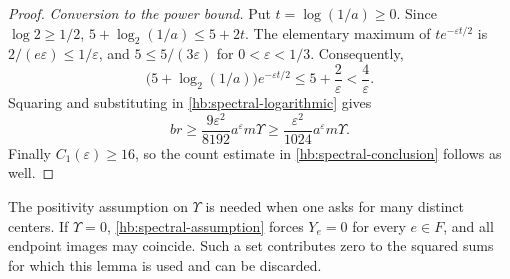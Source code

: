 \begin{proof}
\smallskip
\noindent\emph{Conversion to the power bound.}
Put \(t=\log(1/a)\ge0\).  Since \(\log2\ge1/2\),
\(5+\log_2(1/a)\le5+2t\).
The elementary maximum of \(t e^{-\varepsilon t/2}\) is
\(2/(e\varepsilon)\le1/\varepsilon\), and
\(5\le5/(3\varepsilon)\) for \(0<\varepsilon<1/3\).
Consequently,
\[
 \bigl(5+\log_2(1/a)\bigr)e^{-\varepsilon t/2}
 \le5+\frac2\varepsilon<\frac4\varepsilon.
\]
Squaring and substituting in \eqref{hb:spectral-logarithmic} gives
\[
 br\ge\frac{9\varepsilon^2}{8192}
       a^\varepsilon m\Upsilon
 \ge\frac{\varepsilon^2}{1024}
       a^\varepsilon m\Upsilon.
\]
Finally \(C_1(\varepsilon)\ge16\), so the count estimate in
\eqref{hb:spectral-conclusion} follows as well.
\end{proof}

The positivity assumption on \(\Upsilon\) is needed when one asks for
many distinct centers.  If \(\Upsilon=0\),
\eqref{hb:spectral-assumption} forces \(Y_e=0\) for every \(e\in F\),
and all endpoint images may coincide.  Such a set contributes zero to
the squared sums for which this lemma is used and can be discarded.
